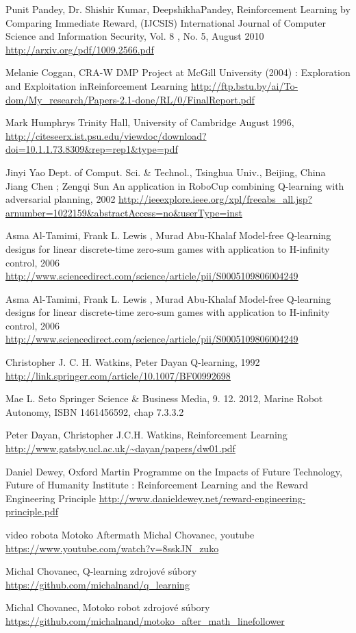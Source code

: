 \begin{thebibliography}{99}
 Punit Pandey, Dr. Shishir Kumar, DeepshikhaPandey,
Reinforcement Learning by Comparing Immediate Reward, (IJCSIS)
International Journal of Computer Science and Information Security, Vol. 8
, No. 5, August 2010
\url{http://arxiv.org/pdf/1009.2566.pdf}

 Melanie Coggan, CRA-W DMP Project at McGill University (2004) :
Exploration and Exploitation inReinforcement Learning
\url{http://ftp.bstu.by/ai/To-dom/My_research/Papers-2.1-done/RL/0/FinalReport.pdf}

 Mark Humphrys Trinity Hall, University of Cambridge August 1996,
\url{http://citeseerx.ist.psu.edu/viewdoc/download?doi=10.1.1.73.8309&rep=rep1&type=pdf}

Jinyi Yao Dept. of Comput. Sci. \& Technol., Tsinghua Univ., Beijing, China Jiang Chen ; Zengqi Sun
An application in RoboCup combining Q-learning with adversarial planning, 2002
\url{http://ieeexplore.ieee.org/xpl/freeabs_all.jsp?arnumber=1022159&abstractAccess=no&userType=inst}


 Asma Al-Tamimi, Frank L. Lewis , Murad Abu-Khalaf
Model-free Q-learning designs for linear discrete-time zero-sum games with application to H-infinity control, 2006
\url{http://www.sciencedirect.com/science/article/pii/S0005109806004249}

 Asma Al-Tamimi, Frank L. Lewis , Murad Abu-Khalaf
Model-free Q-learning designs for linear discrete-time zero-sum games with application to H-infinity control, 2006
\url{http://www.sciencedirect.com/science/article/pii/S0005109806004249}

Christopher J. C. H. Watkins, Peter Dayan
Q-learning, 1992
\url{http://link.springer.com/article/10.1007/BF00992698}

Mae L. Seto Springer Science \& Business Media, 9. 12. 2012,
Marine Robot Autonomy, ISBN	1461456592, chap 7.3.3.2

Peter Dayan, Christopher J.C.H. Watkins,
Reinforcement Learning
\url{http://www.gatsby.ucl.ac.uk/~dayan/papers/dw01.pdf}


Daniel Dewey, Oxford Martin Programme on the Impacts of Future Technology,
Future of Humanity Institute :
Reinforcement Learning and the Reward Engineering Principle
\url{http://www.danieldewey.net/reward-engineering-principle.pdf}

 video robota Motoko Aftermath
Michal Chovanec, youtube
\url{https://www.youtube.com/watch?v=8sskJN_zuko}

 Michal Chovanec, Q-learning zdrojové súbory \url{https://github.com/michalnand/q_learning}

 Michal Chovanec, Motoko robot zdrojové súbory \url{https://github.com/michalnand/motoko_after_math_linefollower}


\end{thebibliography}
